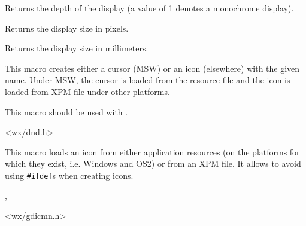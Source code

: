 Returns the depth of the display (a value of 1 denotes a monochrome display).


\label{wxdisplaysize}



Returns the display size in pixels.


\label{wxdisplaysizemm}



Returns the display size in millimeters.


\label{wxdropicon}


This macro creates either a cursor (MSW) or an icon (elsewhere) with the given
name. Under MSW, the cursor is loaded from the resource file and the icon is
loaded from XPM file under other platforms.

This macro should be used with
.


<wx/dnd.h>


\label{wxiconmacro}


This macro loads an icon from either application resources (on the platforms
for which they exist, i.e. Windows and OS2) or from an XPM file. It allows to
avoid using {\tt \#ifdef}s when creating icons.


,


<wx/gdicmn.h>


\label{wxmakemetafileplaceable}


